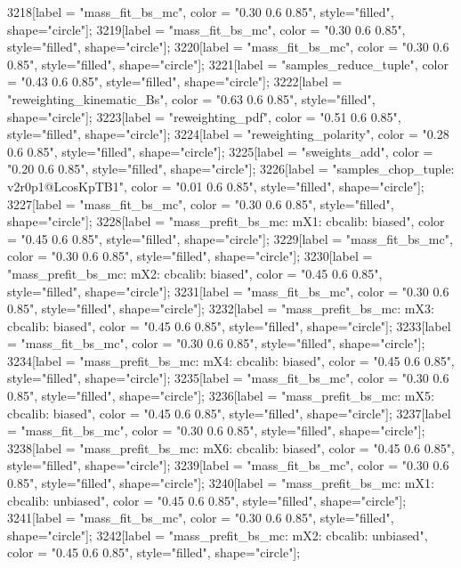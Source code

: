 {	3218[label = "mass_fit_bs_mc", color = "0.30 0.6 0.85", style="filled", shape="circle"];
	3219[label = "mass_fit_bs_mc", color = "0.30 0.6 0.85", style="filled", shape="circle"];
	3220[label = "mass_fit_bs_mc", color = "0.30 0.6 0.85", style="filled", shape="circle"];
	3221[label = "samples_reduce_tuple", color = "0.43 0.6 0.85", style="filled", shape="circle"];
	3222[label = "reweighting_kinematic_Bs", color = "0.63 0.6 0.85", style="filled", shape="circle"];
	3223[label = "reweighting_pdf", color = "0.51 0.6 0.85", style="filled", shape="circle"];
	3224[label = "reweighting_polarity", color = "0.28 0.6 0.85", style="filled", shape="circle"];
	3225[label = "sweights_add", color = "0.20 0.6 0.85", style="filled", shape="circle"];
	3226[label = "samples_chop_tuple\nversion: v2r0p1@LcosKpTB1", color = "0.01 0.6 0.85", style="filled", shape="circle"];
	3227[label = "mass_fit_bs_mc", color = "0.30 0.6 0.85", style="filled", shape="circle"];
	3228[label = "mass_prefit_bs_mc\nmassbin: mX1\nmassmodel: cbcalib\ntrigger: biased", color = "0.45 0.6 0.85", style="filled", shape="circle"];
	3229[label = "mass_fit_bs_mc", color = "0.30 0.6 0.85", style="filled", shape="circle"];
	3230[label = "mass_prefit_bs_mc\nmassbin: mX2\nmassmodel: cbcalib\ntrigger: biased", color = "0.45 0.6 0.85", style="filled", shape="circle"];
	3231[label = "mass_fit_bs_mc", color = "0.30 0.6 0.85", style="filled", shape="circle"];
	3232[label = "mass_prefit_bs_mc\nmassbin: mX3\nmassmodel: cbcalib\ntrigger: biased", color = "0.45 0.6 0.85", style="filled", shape="circle"];
	3233[label = "mass_fit_bs_mc", color = "0.30 0.6 0.85", style="filled", shape="circle"];
	3234[label = "mass_prefit_bs_mc\nmassbin: mX4\nmassmodel: cbcalib\ntrigger: biased", color = "0.45 0.6 0.85", style="filled", shape="circle"];
	3235[label = "mass_fit_bs_mc", color = "0.30 0.6 0.85", style="filled", shape="circle"];
	3236[label = "mass_prefit_bs_mc\nmassbin: mX5\nmassmodel: cbcalib\ntrigger: biased", color = "0.45 0.6 0.85", style="filled", shape="circle"];
	3237[label = "mass_fit_bs_mc", color = "0.30 0.6 0.85", style="filled", shape="circle"];
	3238[label = "mass_prefit_bs_mc\nmassbin: mX6\nmassmodel: cbcalib\ntrigger: biased", color = "0.45 0.6 0.85", style="filled", shape="circle"];
	3239[label = "mass_fit_bs_mc", color = "0.30 0.6 0.85", style="filled", shape="circle"];
	3240[label = "mass_prefit_bs_mc\nmassbin: mX1\nmassmodel: cbcalib\ntrigger: unbiased", color = "0.45 0.6 0.85", style="filled", shape="circle"];
	3241[label = "mass_fit_bs_mc", color = "0.30 0.6 0.85", style="filled", shape="circle"];
	3242[label = "mass_prefit_bs_mc\nmassbin: mX2\nmassmodel: cbcalib\ntrigger: unbiased", color = "0.45 0.6 0.85", style="filled", shape="circle"];
}
